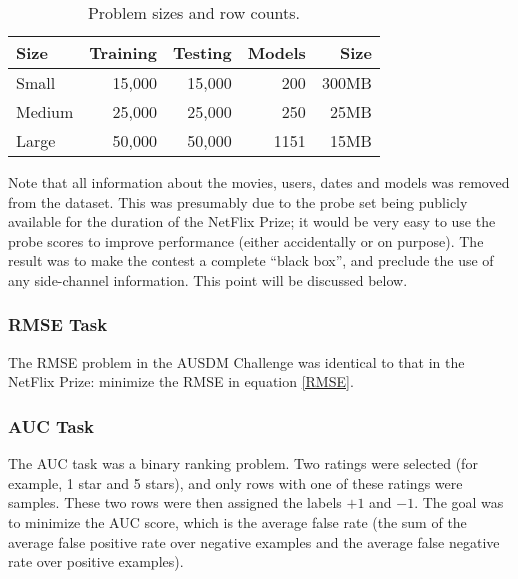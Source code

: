 \documentclass{article}
\begin{document}
\begin{table}[t]
\caption{Problem sizes and row counts.}
\label{problems}
\vskip 0.15in
\begin{center}
\begin{small}
\begin{sc}
\begin{tabular}{lrrrr}
\hline
\abovespace\belowspace
Size & Training & Testing & Models & Size \\
\hline
\abovespace
Small    & 15,000 & 15,000 & 200 & 300MB \\
Medium   & 25,000 & 25,000 & 250 &  25MB \\
\belowspace
Large    & 50,000 & 50,000 & 1151 & 15MB \\
\hline
\end{tabular}
\end{sc}
\end{small}
\end{center}
\vskip -0.1in
\end{table}

Note that all information about the movies, users, dates and models was removed from the dataset.  This was presumably due to the probe set being publicly available for the duration of the NetFlix Prize; it would be very easy to use the probe scores to improve performance (either accidentally or on purpose).  The result was to make the contest a complete ``black box'', and preclude the use of any side-channel information.  This point will be discussed below.

\subsubsection{RMSE Task}

The RMSE problem in the AUSDM Challenge was identical to that in the NetFlix Prize: minimize the RMSE in equation \ref{RMSE}.

\subsubsection{AUC Task}

The AUC task was a binary ranking problem.  Two ratings were selected (for example, 1 star and 5 stars), and only rows with one of these ratings were samples.  These two rows were then assigned the labels $+1$ and $-1$.  The goal was to minimize the AUC score, which is the average false rate (the sum of the average false positive rate over negative examples and the average false negative rate over positive examples).
\end{document}
